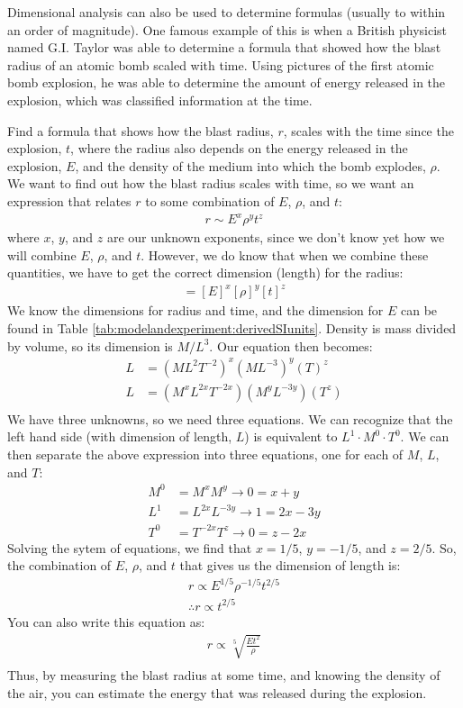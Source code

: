 Dimensional analysis can also be used to determine formulas (usually to within an order of magnitude). One famous example of this is when a British physicist named G.I. Taylor was able to determine a formula that showed how the blast radius of an atomic bomb scaled with time. Using pictures of the first atomic bomb explosion, he was able to determine the amount of energy released in the explosion, which was classified information at the time. 
\newpage
\begin{example}{Find a formula that shows how the blast radius, $r$, scales with the time since the explosion, $t$, where the radius also depends on the energy released in the explosion, $E$, and the density of the medium into which the bomb explodes, $\rho$.} 
We want to find out how the blast radius scales with time, so we want an expression that relates $r$ to some combination of $E$, $\rho$, and $t$:
\begin{align*}
r \sim E^x\rho^y t^z
\end{align*} 
where $x$, $y$, and $z$ are our unknown exponents, since we don't know yet how we will combine $E$, $\rho$, and $t$. However, we do know that when we combine these quantities, we have to get the correct dimension (length) for the radius:
\begin{align*}
[r]=[E]^x[\rho]^y[t]^z
\end{align*}
We know the dimensions for radius and time, and the dimension for $E$ can be found in Table \ref{tab:modelandexperiment:derivedSIunits}. Density is mass divided by volume, so its dimension is $M/L^3$. Our equation then becomes:
\begin{align*}
L&=(ML^2T^{-2})^x(ML^{-3})^y(T)^z\\
L&=(M^xL^{2x}T^{-2x})(M^yL^{-3y})(T^z)\\
\end{align*}
We have three unknowns, so we need three equations. We can recognize that the left hand side (with dimension of length, $L$) is equivalent to $L^1\cdot M^0\cdot T^0$. We can then separate the above expression into three equations, one for each of $M$, $L$, and $T$: 
\begin{align*}
M^0&=M^xM^y \rightarrow 0 = x+y\\
L^1&=L^{2x}L^{-3y} \rightarrow 1=2x-3y\\
T^0&=T^{-2x}T^{z} \rightarrow 0=z-2x
\end{align*}
Solving the sytem of equations, we find that $x=1/5$, $y=-1/5$, and $z=2/5$. 
So, the combination of $E$, $\rho$, and $t$ that gives us the dimension of length is:
\begin{align*}
r\propto E^{1/5}\rho^{-1/5}t^{2/5}\\
\therefore r\propto t^{2/5}
\end{align*}
You can also write this equation as:
\begin{align*}
r\propto \sqrt[5]{\frac{Et^2}{\rho}}\\
\end{align*}
Thus, by measuring the blast radius at some time, and knowing the density of the air, you can estimate the energy that was released during the explosion.
\end{example}

